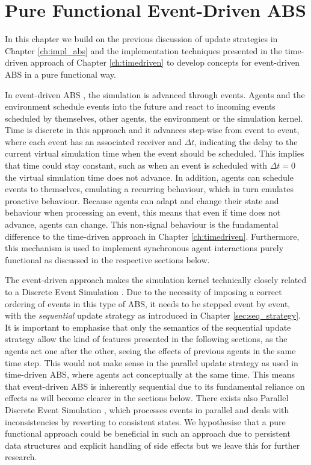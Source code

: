 \chapter{Pure Functional Event-Driven ABS}
\label{ch:eventdriven}
In this chapter we build on the previous discussion of update strategies in Chapter \ref{ch:impl_abs} and the implementation techniques presented in the time-driven approach of Chapter \ref{ch:timedriven} to develop concepts for event-driven ABS in a pure functional way. 

\medskip

In event-driven ABS \cite{meyer_event-driven_2014}, the simulation is advanced through events. Agents and the environment schedule events into the future and react to incoming events scheduled by themselves, other agents, the environment or the simulation kernel. Time is discrete in this approach and it advances step-wise from event to event, where each event has an associated receiver and $\Delta t$, indicating the delay to the current virtual simulation time when the event should be scheduled. This implies that time could stay constant, such as when an event is scheduled with $\Delta t = 0$ the virtual simulation time does not advance. In addition, agents can schedule events to themselves, emulating a recurring behaviour, which in turn emulates proactive behaviour. Because agents can adapt and change their state and behaviour when processing an event, this means that even if time does not advance, agents can change. This non-signal behaviour is the fundamental difference to the time-driven approach in Chapter \ref{ch:timedriven}. Furthermore, this mechanism is used to implement synchronous agent interactions purely functional as discussed in the respective sections below.

The event-driven approach makes the simulation kernel technically closely related to a Discrete Event Simulation \cite{zeigler_theory_2000}. Due to the necessity of imposing a correct ordering of events in this type of ABS, it needs to be stepped event by event, with the \textit{sequential} update strategy as introduced in Chapter \ref{sec:seq_strategy}. It is important to emphasise that only the semantics of the sequential update strategy allow the kind of features  presented in the following sections, as the agents act one after the other, seeing the effects of previous agents in the same time step. This would not make sense in the parallel update strategy as used in time-driven ABS, where agents act conceptually at the same time. This means that event-driven ABS is inherently sequential due to its fundamental reliance on effects as will become clearer in the sections below. There exists also Parallel Discrete Event Simulation \cite{fujimoto_parallel_1990}, which processes events in parallel and deals with inconsistencies by reverting to consistent states. We hypothesise that a pure functional approach could be beneficial in such an approach due to persistent data structures and explicit handling of side effects but we leave this for further research.

